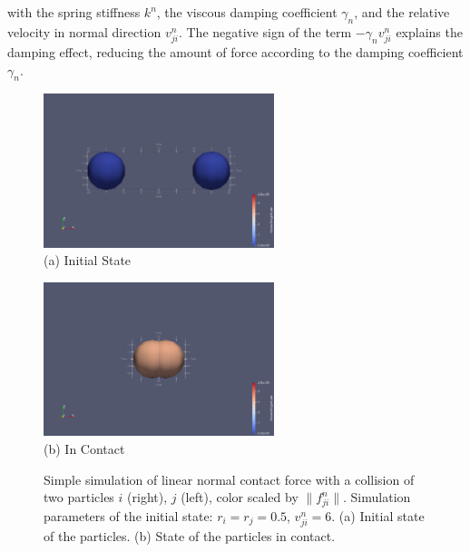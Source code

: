 \documentclass[11pt,
               a4paper,
               bibtotoc,
               idxtotoc,
               headsepline,
               footsepline,
               footexclude,
               BCOR12mm,
               DIV13,
               openany,   %
               ]
               {scrbook}
\begin{document}
with the spring stiffness $k^n$, the viscous damping coefficient $\gamma_n$, and the relative velocity in normal direction $v_{ji}^n$. The negative sign of the term $-\gamma_n v_{ji}^n$ explains the damping effect, reducing the amount of force according to the damping coefficient $\gamma_n$.

\begin{figure}[H]
	\centering
	\begin{center}
		\includegraphics[width=0.6\textwidth]{figures/contactForceLaws/linearNormalContactModel/simple_collision_two_particles_centered.0000.png}
		\\ (a) Initial State %
	\end{center}
	
	\begin{center}
		\includegraphics[width=0.6\textwidth]{figures/contactForceLaws/linearNormalContactModel/simple_collision_two_particles_centered.0044.png}
		\\ (b) In Contact %
	\end{center}
	
	\caption[Combined Caption]{Simple simulation of linear normal contact force with a collision of two particles $i$ (right), $j$ (left), color scaled by $\lVert f^n_{ji} \rVert$. Simulation parameters of the initial state: $r_i = r_j = 0.5$, $v^n_{ji} = 6$. (a) Initial state of the particles. (b) State of the particles in contact.}
	\label{fig:combined_linear_normal_contact_model}
\end{figure}
\end{document}
